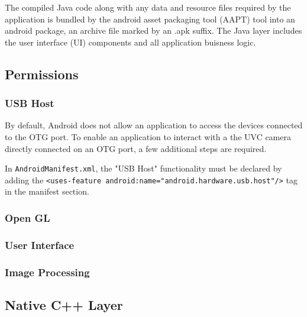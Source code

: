 The compiled Java code along with any data and resource files required by the application is bundled by the android asset packaging tool (AAPT) tool into an android package, an archive file marked by an .apk suffix.
The Java layer includes the user interface (UI) components and all application buisness logic.

\subsection{Permissions}
\subsubsection{USB Host}
By default, Android does not allow an application to access the devices connected to the OTG  port. To enable an application to interact with a the UVC camera directly connected on an OTG port, a few additional steps are required.

 In \texttt{AndroidManifest.xml}, the "USB Host" functionality must be declared by adding the \texttt{<uses-feature android:name="android.hardware.usb.host"/>} tag in the manifest section.

\subsubsection{Open GL}

\subsubsection{User Interface}

\subsubsection{Image Processing}

\subsection{Native C++ Layer}
